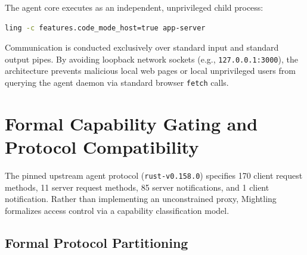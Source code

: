 \documentclass[11pt]{article}
\newcommand{\code}[1]{\texttt{#1}}
\begin{document}
The agent core executes as an independent, unprivileged child process:
\begin{lstlisting}[language=bash]
ling -c features.code_mode_host=true app-server
\end{lstlisting}
Communication is conducted exclusively over standard input and standard output pipes. By avoiding loopback network
sockets (e.g., \code{127.0.0.1:3000}), the architecture prevents malicious local web pages or local unprivileged
users from querying the agent daemon via standard browser \code{fetch} calls.

\section{Formal Capability Gating and Protocol Compatibility}
\label{sec:capability-gating}

The pinned upstream agent protocol (\code{rust-v0.158.0}) specifies 170 client request methods, 11 server request
methods, 85 server notifications, and 1 client notification. Rather than implementing an unconstrained proxy, Mightling
formalizes access control via a capability classification model.

\subsection{Formal Protocol Partitioning}
\end{document}
